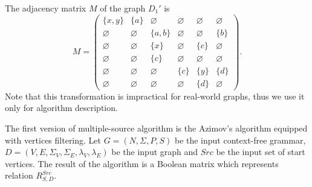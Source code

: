 The adjacency matrix $M$ of the graph $D_1'$ is
{
    \renewcommand{\arraystretch}{0.7}
    \setlength\arraycolsep{2pt}
$$
    M =
    \begin{pmatrix}
    \{x, y\}     & \{a\}       & \varnothing & \varnothing & \varnothing & \varnothing \\
    \varnothing  & \varnothing & \{a, b\}    & \varnothing & \varnothing & \{b\}       \\
    \varnothing  & \varnothing & \{x\}       & \varnothing & \{c\}       & \varnothing \\
    \varnothing  & \varnothing & \{c\}       & \varnothing & \varnothing & \varnothing \\
    \varnothing  & \varnothing & \varnothing & \{c\}       & \{y\}       & \{d\}       \\
    \varnothing  & \varnothing & \varnothing & \varnothing & \{d\}       & \varnothing
    \end{pmatrix}.
$$
}
Note that this transformation is impractical for real-world graphs, thus we use it only for algorithm description.

The first version of multiple-source algorithm is the Azimov's algorithm equipped with vertices filtering.
Let $G = (N, \Sigma, P, S)$ be the input context-free grammar, $D = (V, E, \Sigma_V, \Sigma_E, \lambda_V, \lambda_E)$ be the input graph and $Src$ be the input set of start vertices.
The result of the algorithm is a Boolean matrix which represents relation $R_{S,D}^{Src}$.

